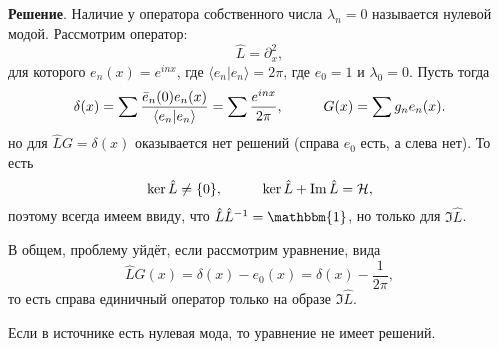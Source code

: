 \textbf{Решение}. Наличие у оператора собственного числа $\lambda_n = 0$ называется нулевой модой. Рассмотрим оператор:
\begin{equation*}
    \hat{L} = \partial_x^2,
\end{equation*}
для которого $e_n (x) = e^{i n x}$, где $\langle e_n | e_n\rangle = 2 \pi$, где $e_0 = 1$ и $\lambda_{0} = 0$. Пусть тогда
\begin{equation*}
    \delta(x) = \sum \frac{\bar{e}_n (0) e_n (x)}{\langle e_n | e_n\rangle} = \sum \frac{e^{i n x}}{2 \pi},
    \hspace{10 mm} 
    G(x) = \sum  g_n e_n (x). 
\end{equation*}
но для $\hat{L} G = \delta(x)$ оказывается нет решений (справа $e_0$ есть, а слева нет). То есть
\begin{equation*}
    \Ker \hat{L} \neq \{0\},
    \hspace{10 mm} 
    \Ker \hat{L} + \Im \hat{L} = \mathcal H,
\end{equation*}
поэтому всегда имеем ввиду, что $\hat{L} \hat{L}^{-1} = \mathbbm{1}$, но только для $\Im \hat{L}$. 

В общем, проблему уйдёт, если рассмотрим уравнение, вида
\begin{equation*}
    \hat{L} G(x) = \delta(x) - e_0(x) = \delta(x) - \frac{1}{2 \pi},
\end{equation*}
то есть справа единичный оператор только на образе $\Im \hat{L}$. 



Если в источнике есть нулевая мода, то уравнение не имеет решений. 

